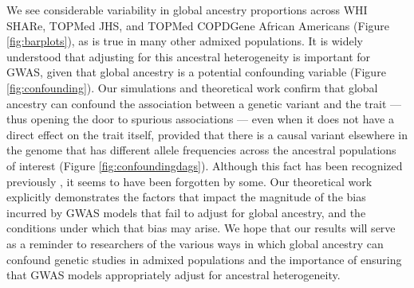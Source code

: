 \documentclass[12pt]{article}
\newcommand{\add}[1]{{\color{red}{[... #1 ...]}}}
\begin{document}
We see considerable variability in global ancestry proportions across WHI SHARe, TOPMed JHS, and TOPMed COPDGene African Americans (Figure \ref{fig:barplots}), as is true in many other admixed populations.
It is widely understood that adjusting for this ancestral heterogeneity is important for GWAS, given that global ancestry is a potential confounding variable (Figure \ref{fig:confounding}). %
Our simulations and theoretical work confirm that global ancestry can confound the association between a genetic variant and the trait --- thus opening the door to spurious associations --- even when it does not have a direct effect on the trait itself, provided that there is a causal variant elsewhere in the genome that has different allele frequencies across the ancestral populations of interest (Figure \ref{fig:confoundingdags}).
Although this fact has been recognized previously \add{CITE 143}, it seems to have been forgotten by some.
Our theoretical work explicitly demonstrates the factors that impact the magnitude of the bias incurred by GWAS models that fail to adjust for global ancestry, and the conditions under which that bias may arise.
We hope that our results will serve as a reminder to researchers of the various ways in which global ancestry can confound genetic studies in admixed populations and the importance of ensuring that GWAS models appropriately adjust for ancestral heterogeneity.
\end{document}
